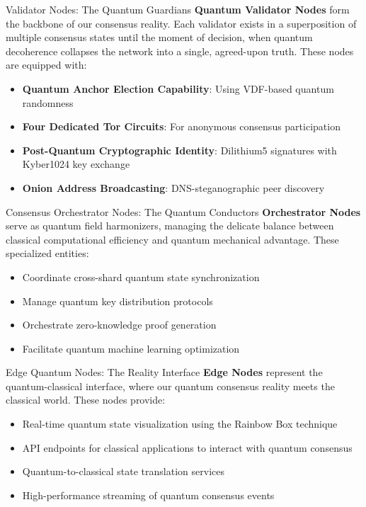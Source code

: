 \documentclass[11pt,a4paper]{article}
\begin{document}
\begin{nodebox}{Validator Nodes: The Quantum Guardians}
\textbf{Quantum Validator Nodes} form the backbone of our consensus reality. Each validator exists in a superposition of multiple consensus states until the moment of decision, when quantum decoherence collapses the network into a single, agreed-upon truth. These nodes are equipped with:

\begin{itemize}
\item \textbf{Quantum Anchor Election Capability}: Using VDF-based quantum randomness
\item \textbf{Four Dedicated Tor Circuits}: For anonymous consensus participation
\item \textbf{Post-Quantum Cryptographic Identity}: Dilithium5 signatures with Kyber1024 key exchange
\item \textbf{Onion Address Broadcasting}: DNS-steganographic peer discovery
\end{itemize}
\end{nodebox}

\begin{nodebox}{Consensus Orchestrator Nodes: The Quantum Conductors}
\textbf{Orchestrator Nodes} serve as quantum field harmonizers, managing the delicate balance between classical computational efficiency and quantum mechanical advantage. These specialized entities:

\begin{itemize}
\item Coordinate cross-shard quantum state synchronization
\item Manage quantum key distribution protocols
\item Orchestrate zero-knowledge proof generation
\item Facilitate quantum machine learning optimization
\end{itemize}
\end{nodebox}

\begin{nodebox}{Edge Quantum Nodes: The Reality Interface}
\textbf{Edge Nodes} represent the quantum-classical interface, where our quantum consensus reality meets the classical world. These nodes provide:

\begin{itemize}
\item Real-time quantum state visualization using the Rainbow Box technique
\item API endpoints for classical applications to interact with quantum consensus
\item Quantum-to-classical state translation services
\item High-performance streaming of quantum consensus events
\end{itemize}
\end{nodebox}
\end{document}
